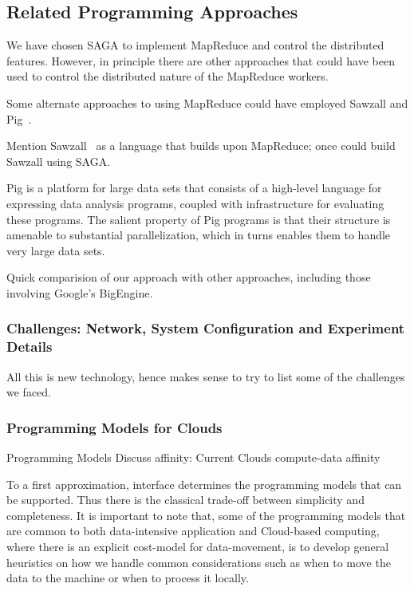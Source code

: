 \documentclass[conference,final]{IEEEtran}
\begin{document}
\subsection*{Related Programming Approaches}

We have chosen SAGA to implement MapReduce and control the distributed
features. However, in principle there are other approaches that could
have been used to control the distributed nature of the MapReduce
workers.

Some alternate approaches to using MapReduce could have employed
Sawzall and Pig~\cite{pig}.

Mention Sawzall~\cite{sawzall} as a language that builds upon
MapReduce; once could build Sawzall using SAGA.

Pig is a platform for large data sets that consists of a high-level
language for expressing data analysis programs, coupled with
infrastructure for evaluating these programs. The salient property of
Pig programs is that their structure is amenable to substantial
parallelization, which in turns enables them to handle very large data
sets.

Quick comparision of our approach with other approaches, including
those involving Google's BigEngine.


\subsubsection*{Challenges: Network, System Configuration and
  Experiment Details}

All this is new technology, hence makes sense to try to list some of
the challenges we faced.

\subsubsection*{Programming Models for Clouds}
Programming Models Discuss affinity: Current Clouds compute-data
affinity


To a first approximation, interface determines the programming models
that can be supported. Thus there is the classical trade-off between
simplicity and completeness.  It is important to note that, some of
the programming models that are common to both data-intensive
application and Cloud-based computing, where there is an explicit
cost-model for data-movement, is to develop general heuristics on how
we handle common considerations such as when to move the data to the
machine or when to process it locally.
\end{document}
